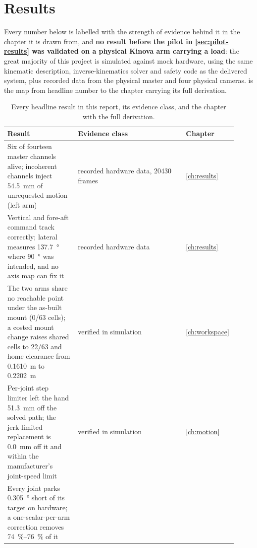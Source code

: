 \chapter{Results}
\label{ch:resultsmain}

Every number below is labelled with the strength of evidence behind it in the
chapter it is drawn from, and \textbf{no result before the pilot in
\cref{sec:pilot-results} was validated on a physical Kinova arm carrying a
load}: the great majority of this project is simulated against mock hardware,
using the same kinematic description, inverse-kinematics solver and safety
code as the delivered system, plus recorded data from the physical master and
four physical cameras.  is the map from headline
number to the chapter carrying its full derivation.

\begin{table}[htbp]
  \centering
  \small
  \caption[Headline results and their evidence class]{Every headline result
  in this report, its evidence class, and the chapter with the full
  derivation.}
  \label{tab:results-summary}
  \begin{tabular}{@{}p{0.30\linewidth}p{0.46\linewidth}p{0.16\linewidth}@{}}
    \toprule
    Result & Evidence class & Chapter \\
    \midrule
    Six of fourteen master channels alive; incoherent channels inject
      \SI{54.5}{\milli\metre} of unrequested motion (left arm)
      & recorded hardware data, \num{20430} frames & \cref{ch:results} \\
    Vertical and fore-aft command track correctly; lateral measures
      \SI{137.7}{\degree} where \SI{90}{\degree} was intended, and no axis map
      can fix it & recorded hardware data & \cref{ch:results} \\
    The two arms share no reachable point under the as-built mount (0/63
      cells); a costed mount change raises shared cells to 22/63 and home
      clearance from \SI{0.1610}{\metre} to \SI{0.2202}{\metre} & verified in
      simulation & \cref{ch:workspace} \\
    Per-joint step limiter left the hand \SI{51.3}{\milli\metre} off the
      solved path; the jerk-limited replacement is \SI{0.0}{\milli\metre} off
      it and within the manufacturer's joint-speed limit & verified in
      simulation & \cref{ch:motion} \\
    Every joint parks \SI{0.305}{\degree} short of its target on hardware; a
      one-scalar-per-arm correction removes \SIrange{74}{76}{\percent} of it

\end{tabular}
\end{table}
